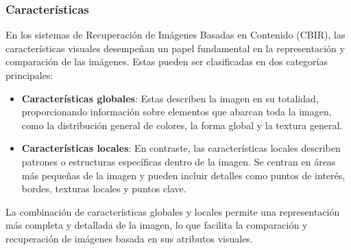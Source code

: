 \subsubsection{Características}
En los sistemas de Recuperación de Imágenes Basadas en Contenido (CBIR), las características visuales desempeñan un papel fundamental en la representación y comparación de las imágenes. Estas pueden ser clasificadas en dos categorías principales:
\begin{itemize}
    \item \textbf{Características globales}: Estas describen la imagen en su totalidad, proporcionando información sobre elementos que abarcan toda la imagen, como la distribución general de colores, la forma global y la textura general.
    \item \textbf{Características locales}:  En contraste, las características locales describen patrones o estructuras específicas dentro de la imagen. Se centran en áreas más pequeñas de la imagen y pueden incluir detalles como puntos de interés, bordes, texturas locales y puntos clave.
\end{itemize}

La combinación de características globales y locales permite una representación más completa y detallada de la imagen, lo que facilita la comparación y recuperación de imágenes basada en sus atributos visuales.

